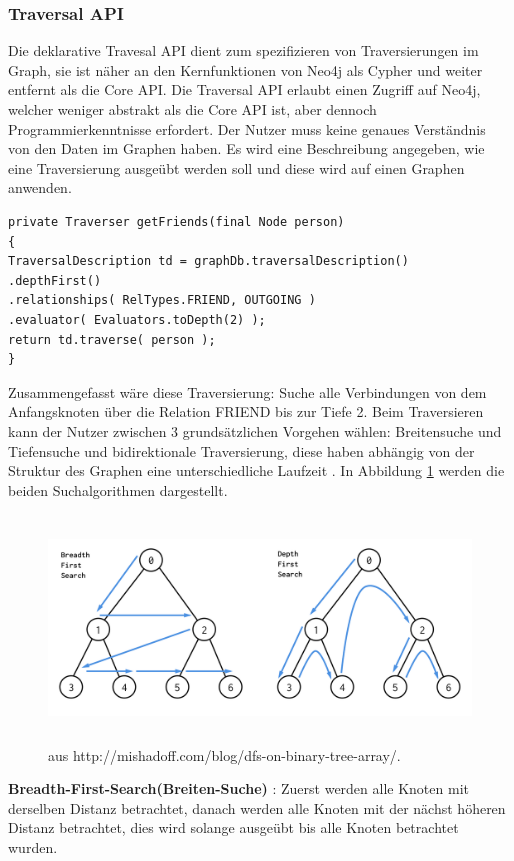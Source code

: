 \subsubsection{Traversal API}
Die deklarative Travesal API dient zum spezifizieren von Traversierungen im Graph, sie ist näher an den Kernfunktionen von Neo4j als Cypher und weiter entfernt als die Core API. Die Traversal API erlaubt einen  Zugriff auf Neo4j, welcher weniger abstrakt als die Core API ist, aber dennoch Programmierkenntnisse erfordert. Der Nutzer muss keine genaues Verständnis von den Daten im Graphen haben. Es wird eine Beschreibung angegeben, wie eine Traversierung  ausgeübt werden soll und diese wird auf einen Graphen anwenden. 
\begin{Verbatim}[frame=single]
private Traverser getFriends(final Node person)
{
TraversalDescription td = graphDb.traversalDescription()
.depthFirst()
.relationships( RelTypes.FRIEND, OUTGOING )
.evaluator( Evaluators.toDepth(2) );
return td.traverse( person );
}
\end{Verbatim}
Zusammengefasst wäre diese Traversierung: Suche alle Verbindungen von dem Anfangsknoten über die Relation FRIEND bis zur Tiefe 2.  Beim Traversieren kann der  Nutzer zwischen 3 grundsätzlichen Vorgehen wählen: Breitensuche und Tiefensuche und bidirektionale Traversierung, diese haben abhängig von der Struktur des Graphen eine unterschiedliche Laufzeit \parencite{vukotic2015neo4j}. In  Abbildung \ref{fig:Search} werden die beiden Suchalgorithmen dargestellt.
\begin{figure}[!htb]
	\centering
	\includegraphics [width=14cm, height=6cm]{Figures/search}
	\caption[Search]{ aus http://mishadoff.com/blog/dfs-on-binary-tree-array/.}
	\label{fig:Search}
\end{figure} \newline
\textbf {Breadth-First-Search(Breiten-Suche)} : Zuerst werden alle Knoten mit derselben Distanz betrachtet, danach werden alle Knoten mit der nächst höheren Distanz betrachtet, dies wird solange ausgeübt bis alle Knoten betrachtet wurden. \newline
